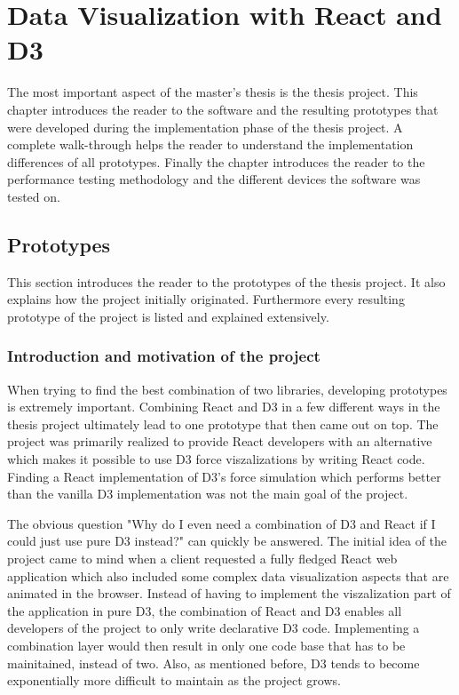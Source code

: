 \chapter{Data Visualization with React and D3}
\label{cha:visualization}

The most important aspect of the master's thesis is the thesis project. This chapter introduces the reader to the software and the resulting prototypes that were developed during the implementation phase of the thesis project. A complete walk-through helps the reader to understand the implementation differences of all prototypes. Finally the chapter introduces the reader to the performance testing methodology and the different devices the software was tested on.

\section{Prototypes}

This section introduces the reader to the prototypes of the thesis project. It also explains how the project initially originated. Furthermore every resulting prototype of the project is listed and explained extensively.

\subsection{Introduction and motivation of the project}

When trying to find the best combination of two libraries, developing prototypes is extremely important. Combining React and D3 in a few different ways in the thesis project ultimately lead to one prototype that then came out on top. The project was primarily realized to provide React developers with an alternative which makes it possible to use D3 force viszalizations by writing React code. Finding a React implementation of D3's force simulation which performs better than the vanilla D3 implementation was not the main goal of the project.

The obvious question "Why do I even need a combination of D3 and React if I could just use pure D3 instead?" can quickly be answered. The initial idea of the project came to mind when a client requested a fully fledged React web application which also included some complex data visualization aspects that are animated in the browser. Instead of having to implement the viszalization part of the application in pure D3, the combination of React and D3 enables all developers of the project to only write declarative D3 code. Implementing a combination layer would then result in only one code base that has to be mainitained, instead of two. Also, as mentioned before, D3 tends to become exponentially more difficult to maintain as the project grows.

